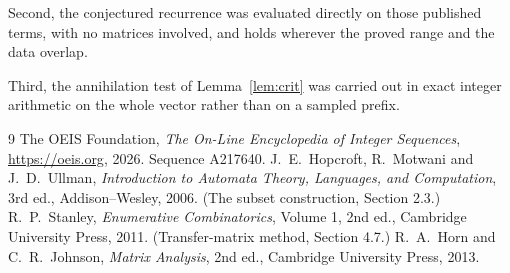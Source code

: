 \documentclass[11pt,a4paper]{article}
\theoremstyle{plain}
\theoremstyle{definition}
\begin{document}
Second, the conjectured recurrence was evaluated directly on those published terms, with no
matrices involved, and holds wherever the proved range and the data overlap.

Third, the annihilation test of Lemma~\ref{lem:crit} was carried out in exact integer
arithmetic on the whole vector rather than on a sampled prefix.

\begin{thebibliography}{9}
 The OEIS Foundation, \emph{The On-Line Encyclopedia of Integer
Sequences}, \url{https://oeis.org}, 2026. Sequence A217640.
 J.~E.~Hopcroft, R.~Motwani and J.~D.~Ullman, \emph{Introduction to Automata
Theory, Languages, and Computation}, 3rd ed., Addison--Wesley, 2006. (The subset
construction, Section 2.3.)
 R.~P.~Stanley, \emph{Enumerative Combinatorics}, Volume 1, 2nd ed.,
Cambridge University Press, 2011. (Transfer-matrix method, Section 4.7.)
 R.~A.~Horn and C.~R.~Johnson, \emph{Matrix Analysis}, 2nd ed., Cambridge
University Press, 2013.
\end{thebibliography}
\end{document}
